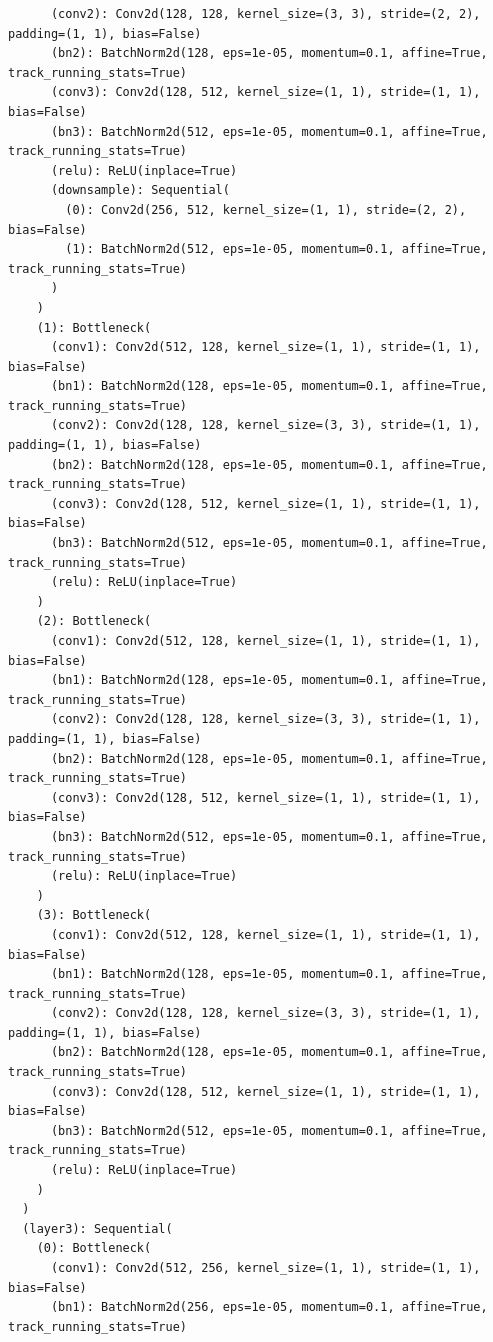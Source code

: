 \documentclass{article}
\begin{document}
\begin{verbatim}
      (conv2): Conv2d(128, 128, kernel_size=(3, 3), stride=(2, 2), padding=(1, 1), bias=False)
      (bn2): BatchNorm2d(128, eps=1e-05, momentum=0.1, affine=True, track_running_stats=True)
      (conv3): Conv2d(128, 512, kernel_size=(1, 1), stride=(1, 1), bias=False)
      (bn3): BatchNorm2d(512, eps=1e-05, momentum=0.1, affine=True, track_running_stats=True)
      (relu): ReLU(inplace=True)
      (downsample): Sequential(
        (0): Conv2d(256, 512, kernel_size=(1, 1), stride=(2, 2), bias=False)
        (1): BatchNorm2d(512, eps=1e-05, momentum=0.1, affine=True, track_running_stats=True)
      )
    )
    (1): Bottleneck(
      (conv1): Conv2d(512, 128, kernel_size=(1, 1), stride=(1, 1), bias=False)
      (bn1): BatchNorm2d(128, eps=1e-05, momentum=0.1, affine=True, track_running_stats=True)
      (conv2): Conv2d(128, 128, kernel_size=(3, 3), stride=(1, 1), padding=(1, 1), bias=False)
      (bn2): BatchNorm2d(128, eps=1e-05, momentum=0.1, affine=True, track_running_stats=True)
      (conv3): Conv2d(128, 512, kernel_size=(1, 1), stride=(1, 1), bias=False)
      (bn3): BatchNorm2d(512, eps=1e-05, momentum=0.1, affine=True, track_running_stats=True)
      (relu): ReLU(inplace=True)
    )
    (2): Bottleneck(
      (conv1): Conv2d(512, 128, kernel_size=(1, 1), stride=(1, 1), bias=False)
      (bn1): BatchNorm2d(128, eps=1e-05, momentum=0.1, affine=True, track_running_stats=True)
      (conv2): Conv2d(128, 128, kernel_size=(3, 3), stride=(1, 1), padding=(1, 1), bias=False)
      (bn2): BatchNorm2d(128, eps=1e-05, momentum=0.1, affine=True, track_running_stats=True)
      (conv3): Conv2d(128, 512, kernel_size=(1, 1), stride=(1, 1), bias=False)
      (bn3): BatchNorm2d(512, eps=1e-05, momentum=0.1, affine=True, track_running_stats=True)
      (relu): ReLU(inplace=True)
    )
    (3): Bottleneck(
      (conv1): Conv2d(512, 128, kernel_size=(1, 1), stride=(1, 1), bias=False)
      (bn1): BatchNorm2d(128, eps=1e-05, momentum=0.1, affine=True, track_running_stats=True)
      (conv2): Conv2d(128, 128, kernel_size=(3, 3), stride=(1, 1), padding=(1, 1), bias=False)
      (bn2): BatchNorm2d(128, eps=1e-05, momentum=0.1, affine=True, track_running_stats=True)
      (conv3): Conv2d(128, 512, kernel_size=(1, 1), stride=(1, 1), bias=False)
      (bn3): BatchNorm2d(512, eps=1e-05, momentum=0.1, affine=True, track_running_stats=True)
      (relu): ReLU(inplace=True)
    )
  )
  (layer3): Sequential(
    (0): Bottleneck(
      (conv1): Conv2d(512, 256, kernel_size=(1, 1), stride=(1, 1), bias=False)
      (bn1): BatchNorm2d(256, eps=1e-05, momentum=0.1, affine=True, track_running_stats=True)

\end{verbatim}
\end{document}

